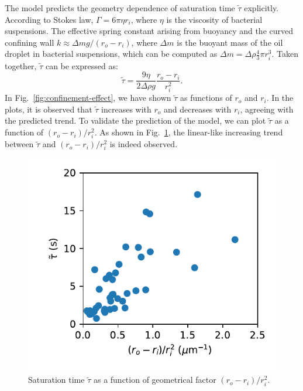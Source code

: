 \documentclass[%
10pt,
superscriptaddress,
twocolumn,
 amsmath,amssymb,
 aps,prx,
]{revtex4-2}
\begin{document}
The model predicts the geometry dependence of saturation time $\tilde\tau$ explicitly. 
According to Stokes law, $\Gamma = 6\pi\eta r_i$, where $\eta$ is the viscosity of bacterial suspensions. 
The effective spring constant arising from buoyancy and the curved confining wall $k \approx \Delta m g / (r_o - r_i)$, where $\Delta m$ is the buoyant mass of the oil droplet in bacterial suspensions, which can be computed as $\Delta m = \Delta \rho \frac{4}{3}\pi r_i^3$. 
Taken together, $\tilde\tau$ can be expressed as:
$$
\tilde\tau = \frac{9\eta}{2\Delta\rho g}\frac{r_o-r_i}{r_i^2}.
$$
In Fig.~\ref{fig:confinement-effect}, we have shown $\tilde\tau$ as functions of $r_o$ and $r_i$. In the plots, it is observed that $\tilde\tau$ increases with $r_o$ and decreases with $r_i$, agreeing with the predicted trend. To validate the prediction of the model, we can plot $\tilde\tau$ as a function of $(r_o-r_i)/r_i^2$. As shown in Fig.~\ref{fig:sat-time}, the linear-like increasing trend between $\tilde\tau$ and $(r_o-r_i)/r_i^2$ is indeed observed.

\begin{figure}[h!]
  \centering
  \includegraphics[width=\columnwidth]{saturation-time}
  \caption{Saturation time $\tilde\tau$ as a function of geometrical factor $(r_o-r_i)/r_i^2$.}
  \label{fig:sat-time}
\end{figure}
\end{document}
